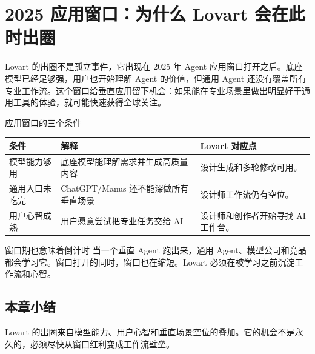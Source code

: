 \section{2025 应用窗口：为什么 Lovart 会在此时出圈}

Lovart 的出圈不是孤立事件，它出现在 2025 年 Agent 应用窗口打开之后。底座模型已经足够强，用户也开始理解 Agent 的价值，但通用 Agent 还没有覆盖所有专业工作流。这个窗口给垂直应用留下机会：如果能在专业场景里做出明显好于通用工具的体验，就可能快速获得全球关注。

\begin{knowledgebox}{应用窗口的三个条件}
\begin{tabularx}{\textwidth}{p{}p{}X}
\toprule
条件 & 解释 & Lovart 对应点 \\
\midrule
模型能力够用 & 底座模型能理解需求并生成高质量内容 & 设计生成和多轮修改可用。 \\
通用入口未吃完 & ChatGPT/Manus 还不能深做所有垂直场景 & 设计师工作流仍有空位。 \\
用户心智成熟 & 用户愿意尝试把专业任务交给 AI & 设计师和创作者开始寻找 AI 工作台。 \\
\bottomrule
\end{tabularx}
\end{knowledgebox}

\begin{warningbox}{窗口期也意味着倒计时}
当一个垂直 Agent 跑出来，通用 Agent、模型公司和竞品都会学习它。窗口打开的同时，窗口也在缩短。Lovart 必须在被学习之前沉淀工作流和心智。
\end{warningbox}

\subsection{本章小结}

Lovart 的出圈来自模型能力、用户心智和垂直场景空位的叠加。它的机会不是永久的，必须尽快从窗口红利变成工作流壁垒。

